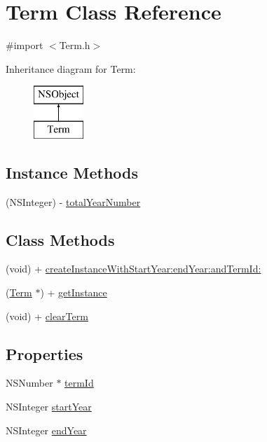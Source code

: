 \hypertarget{interface_term}{\section{Term Class Reference}
\label{interface_term}
}


{\ttfamily \#import $<$Term.\+h$>$}

Inheritance diagram for Term\+:\begin{figure}[H]
\begin{center}
\leavevmode
\includegraphics[height=2.000000cm]{interface_term}
\end{center}
\end{figure}
\subsection*{Instance Methods}
\begin{DoxyCompactItemize}
\item 
(N\+S\+Integer) -\/ \hyperlink{interface_term_ae7418c7e7d2d690f10d789fdcf77bd1d}{total\+Year\+Number}
\end{DoxyCompactItemize}
\subsection*{Class Methods}
\begin{DoxyCompactItemize}
\item 
(void) + \hyperlink{interface_term_ac2d139ddaf21d295e532930469acba21}{create\+Instance\+With\+Start\+Year\+:end\+Year\+:and\+Term\+Id\+:}
\item 
(\hyperlink{interface_term}{Term} $\ast$) + \hyperlink{interface_term_a4cd86e0f1005b3506cca47654a8be9bb}{get\+Instance}
\item 
(void) + \hyperlink{interface_term_ae115c46bc052f8f55e5175a497960be4}{clear\+Term}
\end{DoxyCompactItemize}
\subsection*{Properties}
\begin{DoxyCompactItemize}
\item 
N\+S\+Number $\ast$ \hyperlink{interface_term_a1beacd986e807047abb0da06dd10e5fa}{term\+Id}
\item 
N\+S\+Integer \hyperlink{interface_term_a28f6215d7c7ae2f56b9fb2299ef586f8}{start\+Year}
\item 
N\+S\+Integer \hyperlink{interface_term_a3143ae8c527f7ca31d687a60742d908b}{end\+Year}
\end{DoxyCompactItemize}


